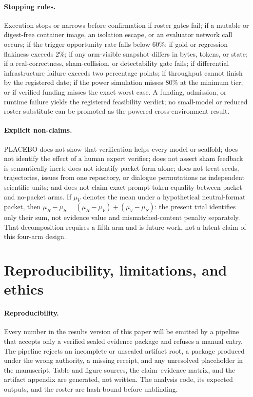 \documentclass{article}
\begin{document}
\paragraph{Stopping rules.} Execution stops or narrows before confirmation if
roster gates fail; if a mutable or digest-free container image, an isolation
escape, or an evaluator network call occurs; if the trigger opportunity rate
falls below 60\%; if gold or regression flakiness exceeds 2\%; if any
arm-visible snapshot differs in bytes, tokens, or state; if a real-correctness,
sham-collision, or detectability gate fails; if differential infrastructure
failure exceeds two percentage points; if throughput cannot finish by the
registered date; if the power simulation misses 80\% at the minimum tier; or if
verified funding misses the exact worst case. A funding, admission, or runtime
failure yields the registered feasibility verdict; no small-model or reduced
roster substitute can be promoted as the powered cross-environment result.

\paragraph{Explicit non-claims.} PLACEBO does not show that verification helps
every model or scaffold; does not identify the effect of a human expert
verifier; does not assert sham feedback is semantically inert; does not identify
packet form alone; does not treat seeds, trajectories, issues from one
repository, or dialogue permutations as independent scientific units; and does
not claim exact prompt-token equality between packet and no-packet arms.
If $\mu_V$ denotes the mean under a hypothetical neutral-format packet, then
$\mu_R-\mu_S=(\mu_R-\mu_V)+(\mu_V-\mu_S)$: the present trial identifies only
their sum, not evidence value and mismatched-content penalty separately. That
decomposition requires a fifth arm and is future work, not a latent claim of
this four-arm design.

\section{Reproducibility, limitations, and ethics}
\label{sec:repro}

\paragraph{Reproducibility.}
Every number in the results version of this paper will be emitted by a pipeline
that accepts only a verified sealed evidence package and refuses a manual entry.
The pipeline rejects an incomplete or unsealed artifact root, a package produced
under the wrong authority, a missing receipt, and any unresolved placeholder in
the manuscript. Table and figure sources, the claim--evidence matrix, and the
artifact appendix are generated, not written. The analysis code, its expected
outputs, and the roster are hash-bound before unblinding.
\end{document}
